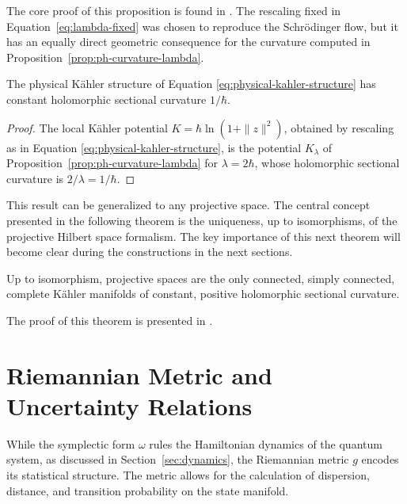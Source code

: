 \noindent The core proof of this proposition is found in \cite[Section 4.5., p.120]{bengtssonGeometryQuantumStates2017}. The rescaling fixed in Equation~\eqref{eq:lambda-fixed} was chosen to reproduce the Schrödinger flow, but it has an equally direct geometric consequence for the curvature computed in Proposition~\ref{prop:ph-curvature-lambda}.

\begin{corollary}
	\label{cor:ph-curvature-hbar}
	The physical Kähler structure of Equation \eqref{eq:physical-kahler-structure} has constant holomorphic sectional curvature $1/\hbar$.
\end{corollary}
\begin{proof}
	The local Kähler potential $K=\hbar\ln(1+\|z\|^2)$, obtained by rescaling as in Equation \eqref{eq:physical-kahler-structure}, is the potential $K_\lambda$ of Proposition~\ref{prop:ph-curvature-lambda} for $\lambda=2\hbar$, whose holomorphic sectional curvature is $2/\lambda=1/\hbar$.
\end{proof}

\noindent This result can be generalized to any projective space. The central concept presented in the following theorem is the uniqueness, up to isomorphisms, of the projective Hilbert space formalism. The key importance of this next theorem will become clear during the constructions in the next sections.

\begin{theorem}
	\label{thm:hawley-igusa}
	Up to isomorphism, projective spaces are the only connected, simply connected, complete Kähler manifolds of constant, positive holomorphic sectional curvature.
\end{theorem}

\noindent The proof of this theorem is presented in \cite[Theorem 7.9]{kobayashiFoundationsDifferentialGeometry1996}.


\section{Riemannian Metric and Uncertainty Relations}
\label{sec:riemannian-geometry}

While the symplectic form $\omega$ rules the Hamiltonian dynamics of the quantum system, as discussed in Section~\ref{sec:dynamics}, the Riemannian metric $g$ encodes its statistical structure. The metric allows for the calculation of dispersion, distance, and transition probability on the state manifold.

